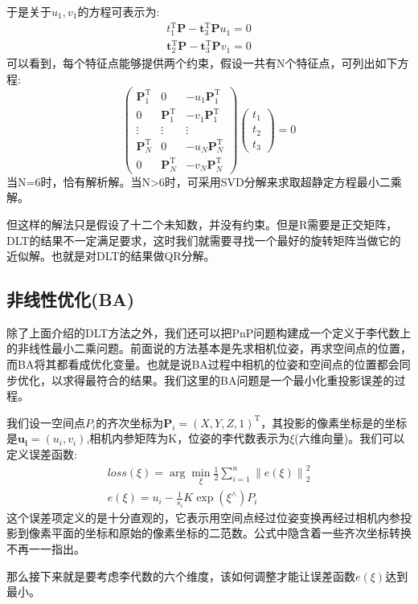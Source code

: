 于是关于$u_1,v_1$的方程可表示为:
\begin{equation}
\begin{array}{l}{t_{1}^{\mathrm{T}} \boldsymbol{P}-\boldsymbol{t}_{3}^{\mathrm{T}} \boldsymbol{P} u_{1}=0} \\ {\boldsymbol{t}_{2}^{\mathrm{T}} \boldsymbol{P}-\boldsymbol{t}_{3}^{\mathrm{T}} \boldsymbol{P} v_{1}=0}\end{array}
\end{equation}
可以看到，每个特征点能够提供两个约束，假设一共有N个特征点，可列出如下方程:
\begin{equation}
\left(\begin{array}{ccc}
{\boldsymbol{P}_{1}^{\mathrm{T}}} & {0} & {-u_{1} \boldsymbol{P}_{1}^{\mathrm{T}}} \\ {0} & {\boldsymbol{P}_{1}^{\mathrm{T}}} & {-v_{1} \boldsymbol{P}_{1}^{\mathrm{T}}} \\ {\vdots} & {\vdots} & {\vdots} \\ {\boldsymbol{P}_{N}^{\mathrm{T}}} & {0} & {-u_{N} \boldsymbol{P}_{N}^{\mathrm{T}}} \\ {0} & {\boldsymbol{P}_{N}^{\mathrm{T}}} & {-v_{N} \boldsymbol{P}_{N}^{\mathrm{T}}}
\end{array}\right)\left( \begin{array}{l}{t_{1}} \\ {t_{2}} \\ {t_{3}}\end{array}\right)=0
\end{equation}
当N=6时，恰有解析解。当N>6时，可采用SVD分解来求取超静定方程最小二乘解。\par
但这样的解法只是假设了十二个未知数，并没有约束。但是R需要是正交矩阵，DLT的结果不一定满足要求，这时我们就需要寻找一个最好的旋转矩阵当做它的近似解。也就是对DLT的结果做QR分解。
\subsection{非线性优化(BA)}
除了上面介绍的DLT方法之外，我们还可以把PnP问题构建成一个定义于李代数上的非线性最小二乘问题。前面说的方法基本是先求相机位姿，再求空间点的位置，而BA将其都看成优化变量。也就是说BA过程中相机的位姿和空间点的位置都会同步优化，以求得最符合的结果。我们这里的BA问题是一个最小化重投影误差的过程。\par
我们设一空间点$P_i$的齐次坐标为$\boldsymbol{P}_i=(X, Y, Z, 1)^{\mathrm{T}}$，其投影的像素坐标是的坐标是$\boldsymbol{u_i}=(u_i, v_i)$,相机内参矩阵为K，位姿的李代数表示为$\xi$(六维向量)。我们可以定义误差函数:
\begin{equation}
\begin{aligned}
loss(\xi)=\arg \min _{\xi} \frac{1}{2} \sum_{i=1}^{n}\left\|e(\xi)\right\|_{2}^{2}\\
e(\xi)=u_{i}-\frac{1}{s_{i}} K \exp \left(\xi^{\wedge}\right) P_{i}
\end{aligned}
\label{equ:ba}
\end{equation}
这个误差项定义的是十分直观的，它表示用空间点经过位姿变换再经过相机内参投影到像素平面的坐标和原始的像素坐标的二范数。公式中隐含着一些齐次坐标转换不再一一指出。\par
那么接下来就是要考虑李代数的六个维度，该如何调整才能让误差函数$e(\xi)$达到最小。
